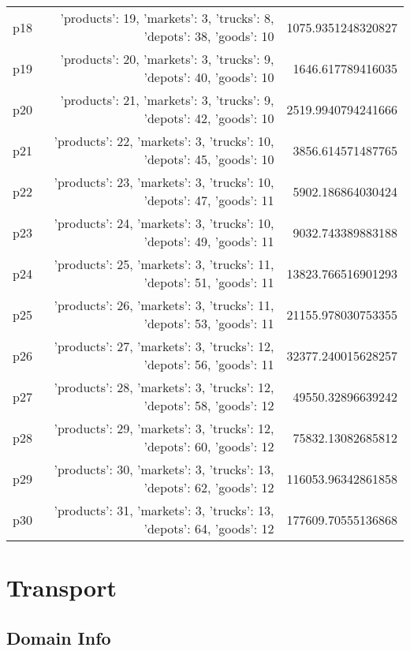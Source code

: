 \documentclass{article}
\begin{document}
\begin{center}
\begin{tabular}{r|r|r}
  p18&{'products': 19, 'markets': 3, 'trucks': 8, 'depots': 38, 'goods': 10}&1075.9351248320827\\
  p19&{'products': 20, 'markets': 3, 'trucks': 9, 'depots': 40, 'goods': 10}&1646.617789416035\\
  p20&{'products': 21, 'markets': 3, 'trucks': 9, 'depots': 42, 'goods': 10}&2519.9940794241666\\
  p21&{'products': 22, 'markets': 3, 'trucks': 10, 'depots': 45, 'goods': 10}&3856.614571487765\\
  p22&{'products': 23, 'markets': 3, 'trucks': 10, 'depots': 47, 'goods': 11}&5902.186864030424\\
  p23&{'products': 24, 'markets': 3, 'trucks': 10, 'depots': 49, 'goods': 11}&9032.743389883188\\
  p24&{'products': 25, 'markets': 3, 'trucks': 11, 'depots': 51, 'goods': 11}&13823.766516901293\\
  p25&{'products': 26, 'markets': 3, 'trucks': 11, 'depots': 53, 'goods': 11}&21155.978030753355\\
  p26&{'products': 27, 'markets': 3, 'trucks': 12, 'depots': 56, 'goods': 11}&32377.240015628257\\
  p27&{'products': 28, 'markets': 3, 'trucks': 12, 'depots': 58, 'goods': 12}&49550.32896639242\\
  p28&{'products': 29, 'markets': 3, 'trucks': 12, 'depots': 60, 'goods': 12}&75832.13082685812\\
  p29&{'products': 30, 'markets': 3, 'trucks': 13, 'depots': 62, 'goods': 12}&116053.96342861858\\
  p30&{'products': 31, 'markets': 3, 'trucks': 13, 'depots': 64, 'goods': 12}&177609.70555136868
                            \end{tabular}
                            \end{center}
                    
                            \newpage \section{Transport}
                    \subsection*{Domain Info}
\end{document}
